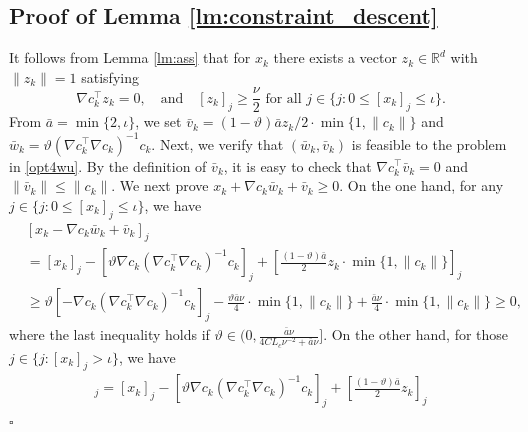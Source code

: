 \documentclass[11pt]{article}
\newenvironment{proof}{{\noindent\it Proof.}\quad}{\hfill $\square$\par}
\begin{document}
\subsection{Proof of Lemma \ref{lm:constraint_descent}}\label{proof:lm4}
\begin{proof}
It follows from {Lemma \ref{lm:ass}} that for $x_k$ there exists a  vector \( z_k \in \mathbb{R}^d \) with $\|z_k\|=1$ satisfying
    \[
    \nabla c_k^\top z_k = 0, \quad\mbox{and}\quad [z_k]_j \geq \frac{\nu}{2} \text{ for all } j \in \{ j : 0 \leq [x_k]_j \leq \iota \}.
    \]
    From \(\bar a = \min\{2,\iota \}\), we set \( \bar v_k = (1 - \vartheta) \bar a z_k/2 \cdot \min\{1,\|c_k\|\}\)  and \( \bar w_k = \vartheta (\nabla c_k^\top \nabla c_k)^{-1} c_k \). Next, we verify that $(\bar w_k,\bar v_k)$ is feasible to the problem in \eqref{opt4wu}. By the definition of \( \bar v_k \), it is easy to check that \( \nabla c_k^\top \bar v_k = 0 \) and $\|\bar v_k\|\le \|c_k\|$. We next  prove  \( x_k + \nabla c_k \bar w_k + \bar v_k \geq 0 \). On the one hand, for any {\(j \in \{ j : 0 \leq [x_k]_j \leq \iota \}\)}, we have
    \begin{align*}
        & [x_k - \nabla c_k \bar w_k + \bar v_k]_j\\
        &= [x_k]_j - \left[\vartheta \nabla c_k(\nabla c_k^\top \nabla c_k)^{-1} c_k\right]_j + \left[\frac{(1 - \vartheta)\bar a}{2 } z_k \cdot \min\{1,\|c_k\|\}\right]_j\\
        &\geq\vartheta\left[- \nabla c_k(\nabla c_k^\top \nabla c_k)^{-1} c_k \right]_j - \frac{\vartheta \bar a\nu}{4}\cdot \min\{1,\|c_k\|\} + \frac{\bar a\nu}{4}\cdot \min\{1,\|c_k\|\} \geq 0,
    \end{align*}
    where the last inequality holds if \(\vartheta \in (0,\frac{\bar a \nu}{4CL_c\nu^{-2}+\bar a \nu}]\). On the other hand, for those \(j \in \{ j : [x_k]_j > \iota \}\), we have
    \begin{align*}
        [x_k - \nabla c_k \bar w_k + \bar v_k]_j = [x_k]_j - \left[\vartheta \nabla c_k(\nabla c_k^\top \nabla c_k)^{-1} c_k\right]_j + \left[\frac{(1 - \vartheta)\bar a}{2 } z_k\right]_j

\end{align*}
\end{proof}
\end{document}
